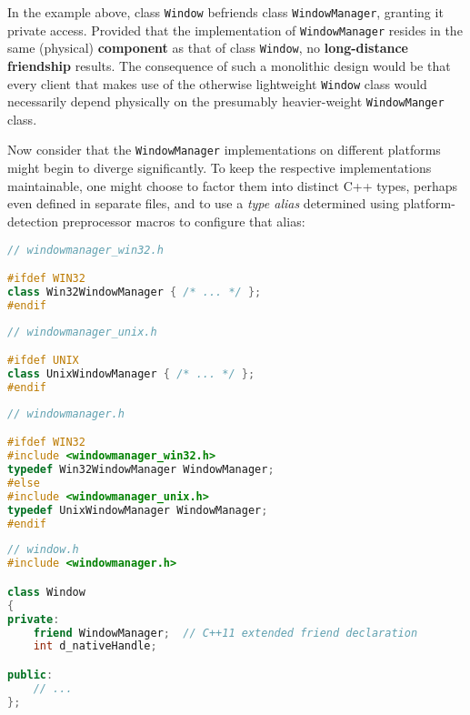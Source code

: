 \noindent In the example above, class \texttt{Window} befriends class
\texttt{WindowManager}, granting it private access. Provided that the
implementation of \texttt{WindowManager} resides in the same (physical)
\textbf{component} as that of class \texttt{Window}, no
\textbf{long-distance friendship} results. The consequence of such a
monolithic design would be that every client that makes use of the
otherwise lightweight \texttt{Window} class would necessarily depend
physically on the presumably heavier-weight \texttt{WindowManger} class.

Now consider that the \texttt{WindowManager} implementations on
different platforms might begin to diverge significantly. To keep the
respective implementations maintainable, one might choose to factor them
into distinct C++ types, perhaps even defined in separate files, and to
use a \emph{type alias} determined using platform-detection preprocessor
macros to configure that alias:


\begin{lstlisting}[language=C++]
// windowmanager_win32.h

#ifdef WIN32
class Win32WindowManager { /* ... */ };
#endif
\end{lstlisting}

\vspace*{2ex}    

\begin{lstlisting}[language=C++]
// windowmanager_unix.h

#ifdef UNIX
class UnixWindowManager { /* ... */ };
#endif
\end{lstlisting}
    
\vspace*{2ex}

\begin{lstlisting}[language=C++]
// windowmanager.h

#ifdef WIN32
#include <windowmanager_win32.h>
typedef Win32WindowManager WindowManager;
#else
#include <windowmanager_unix.h>
typedef UnixWindowManager WindowManager;
#endif
\end{lstlisting}
    
\vspace*{2ex}

\begin{lstlisting}[language=C++]
// window.h
#include <windowmanager.h>

class Window
{
private:
    friend WindowManager;  // C++11 extended friend declaration
    int d_nativeHandle;

public:
    // ...
};
\end{lstlisting}
   
